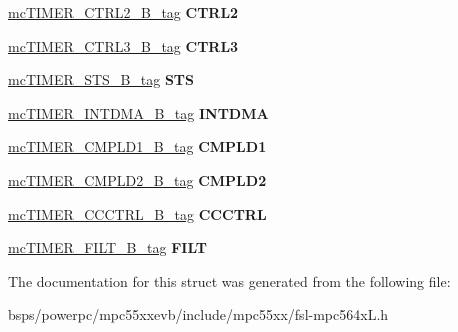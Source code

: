 \begin{DoxyCompactItemize}
\begin{tabbing}
\end{tabbing}\item 
\mbox{\label{structmcTIMER__CHANNEL__struct__tag_a596e809e8441a2d4170c186e860e8864}} 
\mbox{\hyperlink{unionmcTIMER__CTRL2__16B__tag}{mc\+T\+I\+M\+E\+R\+\_\+\+C\+T\+R\+L2\+\_\+B\+\_\+tag}} {\bfseries C\+T\+R\+L2}
\item 
\mbox{\label{structmcTIMER__CHANNEL__struct__tag_afe683b0c2552bf85ceeab700aceb8e89}} 
\mbox{\hyperlink{unionmcTIMER__CTRL3__16B__tag}{mc\+T\+I\+M\+E\+R\+\_\+\+C\+T\+R\+L3\+\_\+B\+\_\+tag}} {\bfseries C\+T\+R\+L3}
\item 
\mbox{\label{structmcTIMER__CHANNEL__struct__tag_adbd87c6dc9117c6aae46548371dc32c5}} 
\mbox{\hyperlink{unionmcTIMER__STS__16B__tag}{mc\+T\+I\+M\+E\+R\+\_\+\+S\+T\+S\+\_\+B\+\_\+tag}} {\bfseries S\+TS}
\item 
\mbox{\label{structmcTIMER__CHANNEL__struct__tag_aa9007678973235441921c1e8d16c079b}} 
\mbox{\hyperlink{unionmcTIMER__INTDMA__16B__tag}{mc\+T\+I\+M\+E\+R\+\_\+\+I\+N\+T\+D\+M\+A\+\_\+B\+\_\+tag}} {\bfseries I\+N\+T\+D\+MA}
\item 
\mbox{\label{structmcTIMER__CHANNEL__struct__tag_a9f97f4d05232965d0764116f5d73ccf7}} 
\mbox{\hyperlink{unionmcTIMER__CMPLD1__16B__tag}{mc\+T\+I\+M\+E\+R\+\_\+\+C\+M\+P\+L\+D1\+\_\+B\+\_\+tag}} {\bfseries C\+M\+P\+L\+D1}
\item 
\mbox{\label{structmcTIMER__CHANNEL__struct__tag_a2e12eaa1326aedc6a4743bb7abe3d6c0}} 
\mbox{\hyperlink{unionmcTIMER__CMPLD2__16B__tag}{mc\+T\+I\+M\+E\+R\+\_\+\+C\+M\+P\+L\+D2\+\_\+B\+\_\+tag}} {\bfseries C\+M\+P\+L\+D2}
\item 
\mbox{\label{structmcTIMER__CHANNEL__struct__tag_a04f22d2b17493c131a02b680beea8f6f}} 
\mbox{\hyperlink{unionmcTIMER__CCCTRL__16B__tag}{mc\+T\+I\+M\+E\+R\+\_\+\+C\+C\+C\+T\+R\+L\+\_\+B\+\_\+tag}} {\bfseries C\+C\+C\+T\+RL}
\item 
\mbox{\label{structmcTIMER__CHANNEL__struct__tag_a63bc2ba84b4e1068801ae329197ba443}} 
\mbox{\hyperlink{unionmcTIMER__FILT__16B__tag}{mc\+T\+I\+M\+E\+R\+\_\+\+F\+I\+L\+T\+\_\+B\+\_\+tag}} {\bfseries F\+I\+LT}
\end{DoxyCompactItemize}


The documentation for this struct was generated from the following file\+:\begin{DoxyCompactItemize}
\item 
bsps/powerpc/mpc55xxevb/include/mpc55xx/fsl-\/mpc564x\+L.\+h\end{DoxyCompactItemize}
